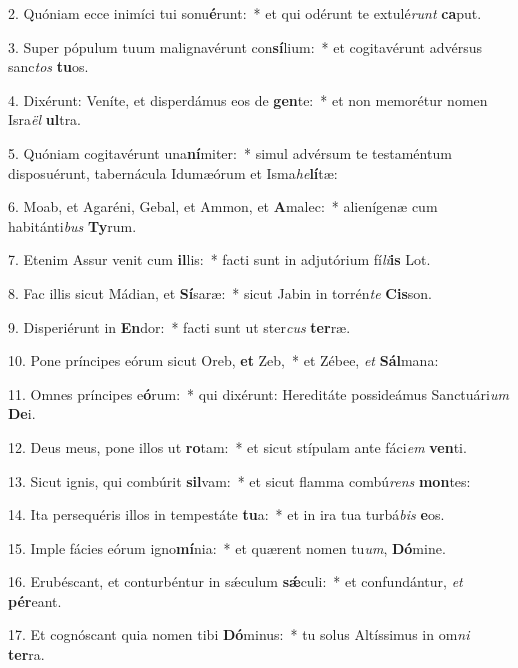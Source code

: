 2. Quóniam ecce inimíci tui sonu\textbf{é}runt:~*  et qui odérunt te extulé\textit{runt} \textbf{ca}put.\

3. Super pópulum tuum malignavérunt con\textbf{sí}lium:~*  et cogitavérunt advérsus sanc\textit{tos} \textbf{tu}os.\

4. Dixérunt: Veníte, et disperdámus eos de \textbf{gen}te:~*  et non memorétur nomen Isra\textit{ël} \textbf{ul}tra.\

5. Quóniam cogitavérunt una\textbf{ní}miter:~*  simul advérsum te testaméntum disposuérunt, tabernácula Idumæórum et Isma\textit{he}\textbf{lí}tæ:\

6. Moab, et Agaréni, Gebal, et Ammon, et \textbf{A}malec:~*  alienígenæ cum habitánti\textit{bus} \textbf{Ty}rum.\

7. Etenim Assur venit cum \textbf{il}lis:~*  facti sunt in adjutórium fí\textit{li}\textbf{is} Lot.\

8. Fac illis sicut Mádian, et \textbf{Sí}saræ:~*  sicut Jabin in torrén\textit{te} \textbf{Cis}son.\

9. Disperiérunt in \textbf{En}dor:~*  facti sunt ut ster\textit{cus} \textbf{ter}ræ.\

10. Pone príncipes eórum sicut Oreb, \textbf{et} Zeb,~*  et Zébee, \textit{et} \textbf{Sál}mana:\

11. Omnes príncipes e\textbf{ó}rum:~*  qui dixérunt: Hereditáte possideámus Sanctuári\textit{um} \textbf{De}i.\

12. Deus meus, pone illos ut \textbf{ro}tam:~*  et sicut stípulam ante fáci\textit{em} \textbf{ven}ti.\

13. Sicut ignis, qui combúrit \textbf{sil}vam:~*  et sicut flamma combú\textit{rens} \textbf{mon}tes:\

14. Ita persequéris illos in tempestáte \textbf{tu}a:~*  et in ira tua turbá\textit{bis} \textbf{e}os.\

15. Imple fácies eórum igno\textbf{mí}nia:~*  et quærent nomen tu\textit{um}, \textbf{Dó}mine.\

16. Erubéscant, et conturbéntur in sǽculum \textbf{sǽ}culi:~*  et confundántur, \textit{et} \textbf{pér}eant.\

17. Et cognóscant quia nomen tibi \textbf{Dó}minus:~*  tu solus Altíssimus in om\textit{ni} \textbf{ter}ra.\

